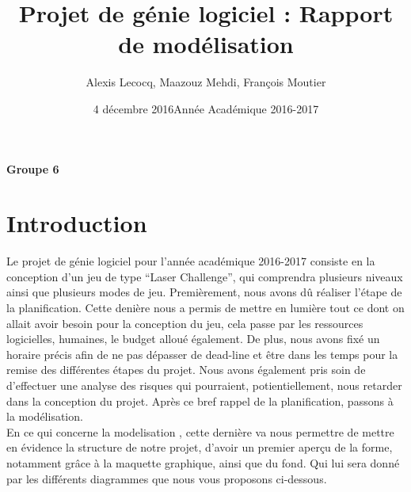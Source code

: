 \documentclass[a4paper,10pt]{article}
\title{Projet de génie logiciel : Rapport de modélisation }
\author{Alexis Lecocq, Maazouz Mehdi, François Moutier}
\date{4 décembre 2016}
\date{Année Académique 2016-2017}
\begin{document}
\maketitle
\textbf{Groupe 6}

\section{Introduction}
Le projet de génie logiciel pour l'année académique 2016-2017 consiste en la conception d'un jeu de type ``Laser Challenge'',
qui comprendra plusieurs niveaux ainsi que plusieurs modes de jeu. Premièrement, nous avons dû réaliser l'étape de la planification.
Cette denière nous a permis de mettre en lumière tout ce dont on allait avoir besoin pour la conception du jeu, cela passe par 
les ressources logicielles, humaines, le budget alloué également. De plus, nous avons fixé un horaire précis afin de ne pas dépasser
de dead-line et être dans les temps pour la remise des différentes étapes du projet. Nous avons également pris soin de d'effectuer une analyse des risques 
qui pourraient, potientiellement, nous retarder dans la conception du projet. Après ce bref rappel de la planification, passons à la modélisation.
\\
En ce qui concerne la modelisation , cette dernière va nous permettre de mettre en évidence la structure de notre projet, d'avoir un premier
aperçu de la forme, notamment grâce à la maquette graphique, ainsi que du fond. Qui lui sera donné par les différents diagrammes que nous vous proposons ci-dessous.

\newpage
\end{document}
